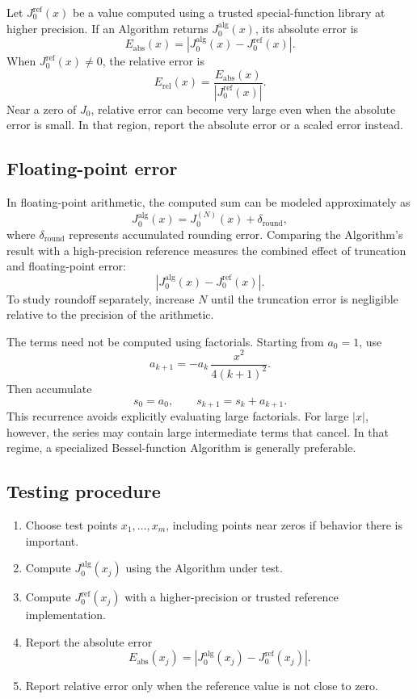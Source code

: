 \documentclass[a4paper, 10pt, onepage]{elegantbook}
\begin{document}
{Let \(J_0^{\mathrm{ref}}(x)\) be a value computed using a trusted
special-function library at higher precision. If an Algorithm returns
\(J_0^{\mathrm{alg}}(x)\), its absolute error is
\[
E_{\mathrm{abs}}(x)
=
\left|J_0^{\mathrm{alg}}(x)-J_0^{\mathrm{ref}}(x)\right|.
\]
When \(J_0^{\mathrm{ref}}(x)\ne0\), the relative error is
\[
E_{\mathrm{rel}}(x)
=
\frac{E_{\mathrm{abs}}(x)}
     {|J_0^{\mathrm{ref}}(x)|}.
\]
Near a zero of \(J_0\), relative error can become very large even when
the absolute error is small. In that region, report the absolute error
or a scaled error instead.

\subsection{Floating-point error}

\noindent

In floating-point arithmetic, the computed sum can be modeled
approximately as
\[
J_0^{\mathrm{alg}}(x)
=
J_0^{(N)}(x)+\delta_{\mathrm{round}},
\]
where \(\delta_{\mathrm{round}}\) represents accumulated rounding
error. Comparing the Algorithm's result with a high-precision reference
measures the combined effect of truncation and floating-point error:
\[
\left|J_0^{\mathrm{alg}}(x)-J_0^{\mathrm{ref}}(x)\right|.
\]
To study roundoff separately, increase \(N\) until the truncation error
is negligible relative to the precision of the arithmetic.


\noindent

The terms need not be computed using factorials. Starting from
\(a_0=1\), use
\[
a_{k+1}
=
-a_k\,\frac{x^2}{4(k+1)^2}.
\]
Then accumulate
\[
s_0=a_0,\qquad s_{k+1}=s_k+a_{k+1}.
\]
This recurrence avoids explicitly evaluating large factorials. For large
\(\lvert x\rvert\), however, the series may contain large intermediate
terms that cancel. In that regime, a specialized Bessel-function
Algorithm is generally preferable.

\subsection{Testing procedure}

\noindent

\begin{enumerate}
  \item Choose test points \(x_1,\ldots,x_m\), including points near
        zeros if behavior there is important.
  \item Compute \(J_0^{\mathrm{alg}}(x_j)\) using the Algorithm under
        test.
  \item Compute \(J_0^{\mathrm{ref}}(x_j)\) with a higher-precision or
        trusted reference implementation.
  \item Report the absolute error
        \[
        E_{\mathrm{abs}}(x_j)
        =
        \left|J_0^{\mathrm{alg}}(x_j)
        -J_0^{\mathrm{ref}}(x_j)\right|.
        \]
  \item Report relative error only when the reference value is not
        close to zero.
\end{enumerate}

}
\end{document}
